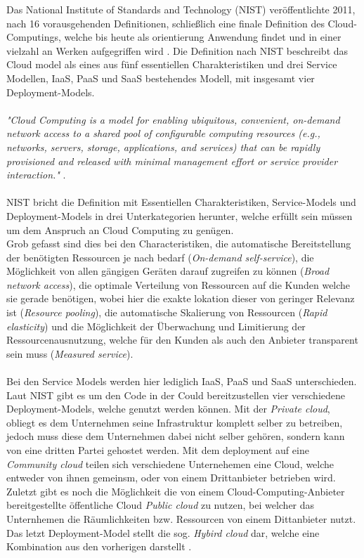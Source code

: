 \documentclass[11pt]{article}
\begin{document}
Das National Institute of Standards and Technology (NIST) veröffentlichte 2011, nach 16 vorausgehenden Definitionen, schließlich eine finale Definition des Cloud-Computings, welche bis heute als orientierung Anwendung findet und in einer vielzahl an Werken aufgegriffen wird \cite{mell2011nist}. Die Definition nach NIST beschreibt das Cloud model als eines aus fünf essentiellen Charakteristiken und drei Service Modellen, IaaS, PaaS und SaaS bestehendes Modell, mit insgesamt vier Deployment-Models.\\\\
\textit{"Cloud Computing is a model for enabling ubiquitous, convenient, on-demand network access to a shared pool of configurable computing resources (e.g., networks, servers, storage, applications, and services) that can be rapidly provisioned and released with minimal management effort or service provider interaction."} \cite{mell2011nist}.\\\\
NIST bricht die Definition mit Essentiellen Charakteristiken, Service-Models und Deployment-Models in drei Unterkategorien herunter, welche erfüllt sein müssen um dem Anspruch an Cloud Computing zu genügen. \\
Grob gefasst sind dies bei den Characteristiken, die automatische Bereitstellung der benötigten Ressourcen je nach bedarf (\textit{On-demand self-service}), die Möglichkeit von allen gängigen Geräten darauf zugreifen zu können (\textit{Broad network access}), die optimale Verteilung von Ressourcen auf die Kunden welche sie gerade benötigen, wobei hier die exakte lokation dieser von geringer Relevanz ist (\textit{Resource pooling}), die automatische Skalierung von Ressourcen (\textit{Rapid elasticity}) und die Möglichkeit der Überwachung und Limitierung der Ressourcenausnutzung, welche für den Kunden als auch den Anbieter transparent sein muss (\textit{Measured service}).\\\\
Bei den Service Models werden hier lediglich IaaS, PaaS und SaaS unterschieden. Laut NIST gibt es um den Code in der Could bereitzustellen vier verschiedene Deployment-Models, welche genutzt werden können. Mit der \textit{Private cloud}, obliegt es dem Unternehmen seine Infrastruktur komplett selber zu betreiben, jedoch muss diese dem Unternehmen dabei nicht selber gehören, sondern kann von eine dritten Partei gehostet werden. Mit dem deployment auf eine \textit{Community cloud} teilen sich verschiedene Unternehemen eine Cloud, welche entweder von ihnen gemeinsm, oder von einem Drittanbieter betrieben wird. Zuletzt gibt es noch die Möglichkeit die von einem Cloud-Computing-Anbieter bereitgestellte öffentliche Cloud \textit{Public cloud} zu nutzen, bei welcher das Unternhemen die Räumlichkeiten bzw. Ressourcen von einem Dittanbieter nutzt. Das letzt Deployment-Model stellt die sog. \textit{Hybird cloud} dar, welche eine Kombination aus den vorherigen darstellt \cite{mell2011nist}.
\end{document}
